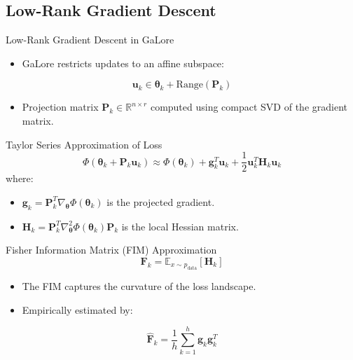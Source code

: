 \documentclass{beamer}
\begin{document}
\subsection{Low-Rank Gradient Descent}

\begin{frame}{Low-Rank Gradient Descent in GaLore}
    \begin{itemize}
        \item GaLore restricts updates to an affine subspace:
    \end{itemize}
    \begin{equation}
        \mathbf{u}_k \in \mathbf{\theta}_k + \text{Range}(\mathbf{P}_k)
    \end{equation}
    \begin{itemize}
        \item Projection matrix \(\mathbf{P}_k \in \mathbb{R}^{n \times r}\) computed using compact SVD of the gradient matrix.
    \end{itemize}
\end{frame}

\begin{frame}{Taylor Series Approximation of Loss}
    \begin{equation}
        \Phi(\mathbf{\theta}_k + \mathbf{P}_k \mathbf{u}_k) \approx \Phi(\mathbf{\theta}_k) + \mathbf{g}_k^T \mathbf{u}_k + \frac{1}{2} \mathbf{u}_k^T \mathbf{H}_k \mathbf{u}_k
        \label{eq:taylor_series_expansion}
    \end{equation}
    where:
    \begin{itemize}
        \item \(\mathbf{g}_k = \mathbf{P}_k^T \nabla_{\mathbf{\theta}} \Phi(\mathbf{\theta}_k)\) is the projected gradient.
        \item \(\mathbf{H}_k = \mathbf{P}_k^T \nabla^2_{\mathbf{\theta}} \Phi(\mathbf{\theta}_k) \mathbf{P}_k\) is the local Hessian matrix.
    \end{itemize}
\end{frame}

\begin{frame}{Fisher Information Matrix (FIM) Approximation}
    \begin{equation}
        \mathbf{F}_k = \mathbb{E}_{x \sim p_{\text{data}}} [ \mathbf{H}_k ]
    \end{equation}
    \begin{itemize}
        \item The FIM captures the curvature of the loss landscape.
        \item Empirically estimated by:
    \end{itemize}
    \begin{equation}
        \mathbf{\hat{F}}_k = \frac{1}{h} \sum_{k=1}^{h} \mathbf{g}_k \mathbf{g}_k^T
    \end{equation}
\end{frame}
\end{document}
